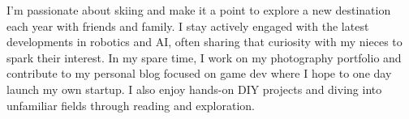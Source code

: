 

\begin{cvparagraph}

I’m passionate about skiing and make it a point to explore a new destination each year with friends and family. I stay actively engaged with the latest developments in robotics and AI, often sharing that curiosity with my nieces to spark their interest. In my spare time, I work on my photography portfolio and contribute to my personal blog focused on game dev where I hope to one day launch my own startup. I also enjoy hands-on DIY projects and diving into unfamiliar fields through reading and exploration.

\end{cvparagraph}
